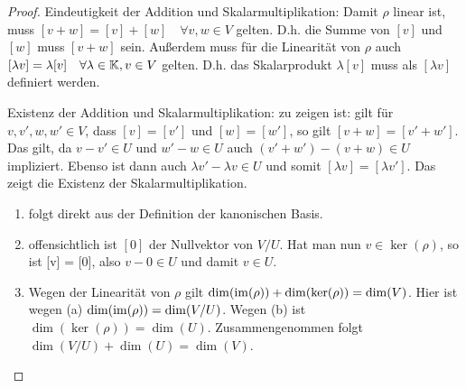 \begin{proof}
	Eindeutigkeit der Addition und Skalarmultiplikation:
	Damit $ \rho $ linear ist, muss $ [v+w] = [v] + [w] \quad \forall v,w \in V $ gelten. D.h. die Summe von $ [v] $ und $ [w] $ muss $ [v+w] $ sein. Außerdem muss für die Linearität von $ \rho $ auch $ [\lambda v] = \lambda [v] \quad \forall \lambda \in \mathbb K, v \in V $ gelten. D.h. das Skalarprodukt $ \lambda[v] $ muss als  $ [\lambda v] $ definiert werden.
	
	Existenz der Addition und Skalarmultiplikation:
	zu zeigen ist: gilt für $ v,v',w,w' \in V $, dass $ [v] = [v'] $ und $ [w] = [w'] $, so gilt $ [v+w] = [v'+w'] $. Das gilt, da $ v-v' \in U $ und $ w' - w \in U $ auch $ (v'+w') - (v+w) \in U $ impliziert. Ebenso ist dann auch $ \lambda v' - \lambda v \in U $ und somit $ [\lambda v] = [\lambda v'] $. Das zeigt die Existenz der Skalarmultiplikation.
	\begin{enumerate}[label=\normalfont(\alph*)]
		\item folgt direkt aus der Definition der kanonischen Basis.
		\item offensichtlich ist $ [0] $ der Nullvektor von $ V/U $. Hat man nun $ v \in \ker(\rho) $, so ist [v] = [0], also $ v-0 \in U $ und damit $ v \in U $.
		\item Wegen der Linearität von $ \rho $ gilt $ \dim(\operatorname{im}(\rho)) + \dim(\ker(\rho)) = \dim(V) $. Hier ist wegen (a) $ \dim(\operatorname{im}(\rho)) = \dim(V/U) $. Wegen (b) ist $ \dim(\ker(\rho)) = \dim(U) $. Zusammengenommen folgt $ \dim(V/U) + \dim(U) = \dim(V) $. \qedhere
	\end{enumerate}
\end{proof}

